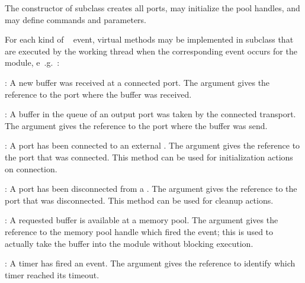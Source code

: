 \begin{compactenum}

\item  The constructor of  subclass  creates all 
      ports, may initialize the pool handles, and may 
      define commands and parameters. 
\item  For each kind of \dabc~ event, virtual methods  may be
implemented in  subclass that are executed 
by the working thread when the corresponding event occurs for the module, e~.g.~:
\begin{compactdesc}
	\item [\func{void ProcessInputEvent(Port* port)}] : 
	A new buffer was received at a connected port. The  argument
	gives the reference to the port where the buffer was received.
	
	\item [\func{void ProcessOutputEvent(Port* port)}] :
	A buffer in the queue of an output port was taken by the connected
	transport. The  argument
	gives the reference to the port where the buffer was send.
	 
	 \item [\func{void ProcessConnectEvent(Port* port)}] :
	 A port has been connected to an external .
	  The  argument
	gives the reference to the port that was connected. This method can
	be used for initialization actions on connection.
	  
         \item  [\func{void ProcessDisconnectEvent(Port* port)}]:	
 	A port has been disconnected from a .
	  The  argument gives the reference to the port that 
	  was disconnected. This method can be used for cleanup actions.
	
         \item [\func{void ProcessPoolEvent(PoolHandle* pool)}]: 
	 A requested buffer is available at a memory pool.  The
	  argument gives the reference to the memory 
	 pool handle which fired the event; this is used to actually take the
	 buffer into the module without blocking execution.
          
	  \item [\func{void ProcessTimerEvent(Timer* timer)}]:
	  A timer has fired an event.  The
	  argument gives the reference to identify which
	 timer reached its timeout.  
        
\end{compactdesc}      


\end{compactenum}
